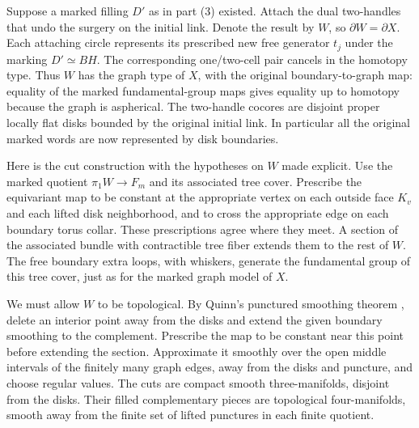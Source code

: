 \documentclass[11pt]{article}
\theoremstyle{definition}
\theoremstyle{remark}
\begin{document}
Suppose a marked filling $D'$ as in part (3) existed.  Attach the
dual two-handles that undo the surgery on the initial link.  Denote
the result by $W$, so $\partial W=\partial X$.  Each attaching circle
represents its prescribed new free generator $t_j$ under the marking
$D'\simeq BH$.  The corresponding one/two-cell pair cancels in the
homotopy type.  Thus $W$ has the graph type of $X$, with the original
boundary-to-graph map: equality of the marked fundamental-group maps
gives equality up to homotopy because the graph is aspherical.
The two-handle cocores are disjoint proper locally flat disks bounded
by the original initial link.  In particular all the original marked
words are now represented by disk boundaries.

Here is the cut construction with the hypotheses on $W$ made explicit.
Use the marked quotient $\pi_1W\to F_m$ and its associated tree cover.
Prescribe the equivariant map to be constant at the appropriate vertex
on each outside face $K_v$ and each lifted disk neighborhood, and
to cross the appropriate edge on each boundary torus collar.  These
prescriptions agree where they meet.  A section of the associated
bundle with contractible tree fiber extends them to the rest of $W$.
The free boundary extra loops, with whiskers, generate the fundamental
group of this tree cover, just as for the marked graph model of $X$.

We must allow $W$ to be topological.  By Quinn's punctured smoothing
theorem \cite[Corollary~2.2.3]{QuinnEnds}, delete an interior point
away from the disks and extend the given boundary smoothing to the
complement.  Prescribe the map to be constant near this point before
extending the section.  Approximate it smoothly over the open middle
intervals of the finitely many graph edges, away from the disks and
puncture, and choose regular values.  The cuts are compact smooth
three-manifolds, disjoint from the disks.  Their filled complementary
pieces are topological four-manifolds, smooth away from the finite
set of lifted punctures in each finite quotient.
\end{document}
